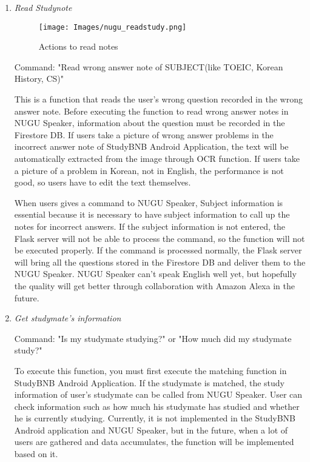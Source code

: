 \documentclass[conference]{IEEEtran}
\begin{document}
\begin{enumerate}
\begin{enumerate}
        \item \textit{Read Studynote}
        
                \begin{figure}[htp]
    \centering
    \texttt{[image: Images/nugu\_readstudy.png]}
    \caption{Actions to read notes}
\end{figure}
        
        Command: "Read wrong answer note of SUBJECT(like TOEIC, Korean History, CS)"
        
This is a function that reads the user's wrong question recorded in the wrong answer note. Before executing the function to read wrong answer notes in NUGU Speaker, information about the question must be recorded in the Firestore DB. If users take a picture of wrong answer problems in the incorrect answer note of StudyBNB Android Application, the text will be automatically extracted from the image through OCR function. If users take a picture of a problem in Korean, not in English, the performance is not good, so users have to edit the text themselves.

When users gives a command to NUGU Speaker, Subject information is essential because it is necessary to have subject information to call up the notes for incorrect answers. If the subject information is not entered, the Flask server will not be able to process the command, so the function will not be executed properly. If the command is processed normally, the Flask server will bring all the questions stored in the Firestore DB and deliver them to the NUGU Speaker. NUGU Speaker can't speak English well yet, but hopefully the quality will get better through collaboration with Amazon Alexa in the future.\\

        
        
        \item \textit{Get studymate's information}
        
        Command: "Is my studymate studying?" or "How much did my studymate study?"
        
To execute this function, you must first execute the matching function in StudyBNB Android Application. If the studymate is matched, the study information of user's studymate can be called from NUGU Speaker. User can check information such as how much his studymate has studied and whether he is currently studying. Currently, it is not implemented in the StudyBNB Android application and NUGU Speaker, but in the future, when a lot of users are gathered and data accumulates, the function will be implemented based on it.

    \end{enumerate}
\end{enumerate}
\end{document}
